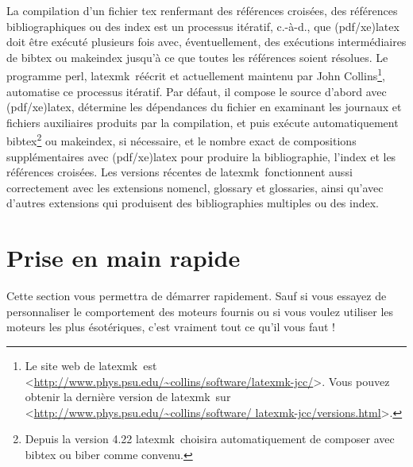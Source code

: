 \documentclass[11pt,french]{article}
\newcommand{\TS}{\textsf{\TeX Shop}}
\newcommand{\latexmk}{\textsf{latexmk}}
\newcommand{\mnu}[1]{\textsf{#1}}
\newcommand{\cmd}[1]{\textsf{#1}}
\begin{document}
La compilation d'un fichier \cmd{tex} renfermant des références croisées, des références bibliographiques ou des index est un processus itératif, c.-à-d., que (\cmd{pdf/xe)latex} doit être exécuté plusieurs fois avec, éventuellement, des exécutions intermédiaires de \cmd{bibtex} ou \cmd{makeindex} jusqu'à ce que toutes les références soient résolues. Le programme \cmd{perl}, \latexmk\, réécrit et actuellement maintenu par John Collins\footnote{Le site web de \latexmk\ est <\url{http://www.phys.psu.edu/~collins/software/latexmk-jcc/}>.
Vous pouvez obtenir la dernière version de \latexmk\ sur <\url{http://www.phys.psu.edu/~collins/software/
latexmk-jcc/versions.html}>.}, automatise ce processus itératif. Par défaut, il compose le source d'abord avec (\cmd{pdf/xe)latex}, détermine les dépendances du fichier en examinant les journaux et fichiers auxiliaires produits par la compilation, et puis exécute automatiquement \cmd{bibtex}\footnote{Depuis la version 4.22 \latexmk\ choisira automatiquement de composer avec \cmd{bibtex} ou \cmd{biber} comme convenu.} ou \cmd{makeindex}, si nécessaire, et le nombre exact de compositions supplémentaires avec (\cmd{pdf/xe)latex} pour produire la bibliographie, l'index et les références croisées. Les versions récentes de \latexmk\ fonctionnent aussi correctement avec les extensions \cmd{nomencl}, \cmd{glossary} et \cmd{glossaries}, ainsi qu'avec d'autres extensions qui produisent des bibliographies multiples ou des index.


%

\section{Prise en main rapide}

Cette section vous permettra de démarrer rapidement. Sauf si vous essayez de personnaliser le comportement des moteurs fournis ou si vous voulez utiliser les moteurs les plus ésotériques, c'est vraiment tout ce qu'il vous faut !

%
\end{document}

